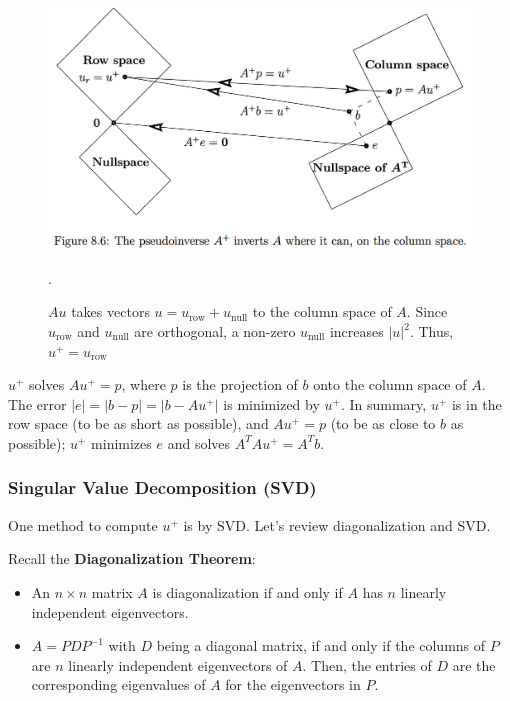 \documentclass[]{article}
\newcommand{\norm}[1]{\lvert #1 \rvert}
\begin{document}
\begin{figure}[H]
	\centering
	\includegraphics[width=0.8\linewidth]{figs/Strang_pseudoinverse}
	\caption{$Au$ takes vectors $u = u_{\textrm{row}} + u_{\textrm{null}}$ to the column space of $A$. Since $u_{\textrm{row}}$ and $u_{\textrm{null}}$ are orthogonal, a non-zero $u_{\textrm{null}}$ increases $\norm{u}^{2}$. Thus, $u^{+} = u_{\textrm{row}}$}. 
	\label{fig:strangpseudoinverse}
\end{figure}

$u^{+}$ solves $Au^{+} = p$, where $p$ is the projection of $b$ onto the column space of $A$. The error $\norm{e} = \norm{b-p} = \norm{b-Au^{+}}$ is minimized by $u^{+}$. In summary, $u^{+}$ is in the row space (to be as short as possible), and $Au^{+} = p$ (to be as close to $b$ as possible); $u^{+}$ minimizes $e$ and solves $A^T A u^{+} = A^T b$. 

\subsubsection{Singular Value Decomposition (SVD)}
One method to compute $u^{+}$ is by SVD. Let's review diagonalization and SVD. 

Recall the \textbf{Diagonalization Theorem}:
\begin{itemize}
	\item An $n \times n$ matrix $A$ is diagonalization if and only if $A$ has $n$ linearly independent eigenvectors.
	\item $A = PDP^{-1}$ with $D$ being a diagonal matrix, if and only if the columns of $P$ are $n$ linearly independent eigenvectors of $A$. Then, the entries of $D$ are the corresponding eigenvalues of $A$ for the eigenvectors in $P$. 
\end{itemize}
\end{document}
